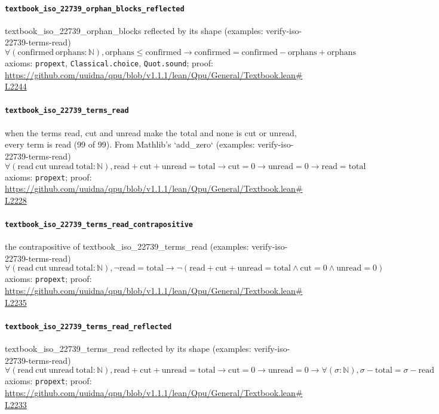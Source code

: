 \documentclass[11pt]{article}
\begin{document}
\paragraph{\texttt{textbook\_iso\_22739\_orphan\_blocks\_reflected}}
textbook\_iso\_22739\_orphan\_blocks reflected by its shape (examples: verify-iso-22739-terms-read)
\[ \forall (\mathrm{confirmed}\ \mathrm{orphans} : \mathbb{N}), \mathrm{orphans} \le \mathrm{confirmed} \to \mathrm{confirmed} = \mathrm{confirmed} - \mathrm{orphans} + \mathrm{orphans} \]
\noindent axioms: \texttt{propext}, \texttt{Classical.choice}, \texttt{Quot.sound}; proof: \url{https://github.com/uuidna/qpu/blob/v1.1.1/lean/Qpu/General/Textbook.lean\#L2244}

\paragraph{\texttt{textbook\_iso\_22739\_terms\_read}}
when the terms read, cut and unread make the total and none is cut or unread, every term is read (99 of 99). From Mathlib's `add\_zero` (examples: verify-iso-22739-terms-read)
\[ \forall (\mathrm{read}\ \mathrm{cut}\ \mathrm{unread}\ \mathrm{total} : \mathbb{N}), \mathrm{read} + \mathrm{cut} + \mathrm{unread} = \mathrm{total} \to \mathrm{cut} = 0 \to \mathrm{unread} = 0 \to \mathrm{read} = \mathrm{total} \]
\noindent axioms: \texttt{propext}; proof: \url{https://github.com/uuidna/qpu/blob/v1.1.1/lean/Qpu/General/Textbook.lean\#L2228}

\paragraph{\texttt{textbook\_iso\_22739\_terms\_read\_contrapositive}}
the contrapositive of textbook\_iso\_22739\_terms\_read (examples: verify-iso-22739-terms-read)
\[ \forall (\mathrm{read}\ \mathrm{cut}\ \mathrm{unread}\ \mathrm{total} : \mathbb{N}), \neg \mathrm{read} = \mathrm{total} \to \neg (\mathrm{read} + \mathrm{cut} + \mathrm{unread} = \mathrm{total} \land \mathrm{cut} = 0 \land \mathrm{unread} = 0) \]
\noindent axioms: \texttt{propext}; proof: \url{https://github.com/uuidna/qpu/blob/v1.1.1/lean/Qpu/General/Textbook.lean\#L2235}

\paragraph{\texttt{textbook\_iso\_22739\_terms\_read\_reflected}}
textbook\_iso\_22739\_terms\_read reflected by its shape (examples: verify-iso-22739-terms-read)
\[ \forall (\mathrm{read}\ \mathrm{cut}\ \mathrm{unread}\ \mathrm{total} : \mathbb{N}), \mathrm{read} + \mathrm{cut} + \mathrm{unread} = \mathrm{total} \to \mathrm{cut} = 0 \to \mathrm{unread} = 0 \to \forall (\sigma : \mathbb{N}), \sigma - \mathrm{total} = \sigma - \mathrm{read} \]
\noindent axioms: \texttt{propext}; proof: \url{https://github.com/uuidna/qpu/blob/v1.1.1/lean/Qpu/General/Textbook.lean\#L2233}
\end{document}
